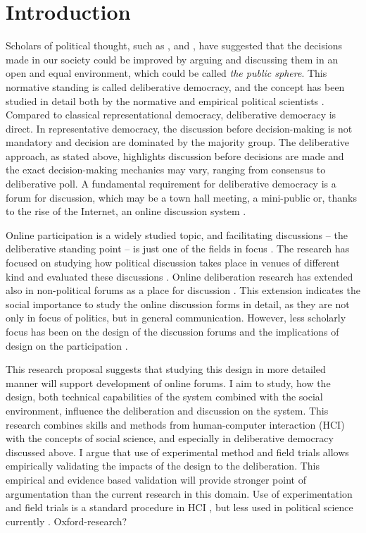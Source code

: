 \documentclass{article}
\begin{document}
\newpage

\section{Introduction}

Scholars of political thought, such as ,  and , have suggested that the decisions made in our society could be improved by arguing and discussing them in an open and equal environment, which could be called \textit{the public sphere}. This normative standing is called deliberative democracy, and the concept has been studied in detail both by the normative and empirical political scientists . Compared to classical representational democracy, deliberative democracy is direct. In representative democracy, the discussion before decision-making is not mandatory and decision are dominated by the majority group. The deliberative approach, as stated above, highlights discussion before decisions are made and the exact decision-making mechanics may vary, ranging from consensus to deliberative poll. A fundamental requirement for deliberative democracy is a forum for discussion, which may be a town hall meeting, a mini-public or, thanks to the rise of the Internet, an online discussion system .

Online participation is a widely studied topic, and facilitating discussions -- the deliberative standing point -- is just one of the fields in focus . The research has focused on studying how political discussion takes place in venues of different kind  and evaluated these discussions . Online deliberation research has extended also in non-political forums as a place for discussion \cite{graham12}. This extension indicates the social importance to study the online discussion forms in detail, as they are not only in focus of politics, but in general communication. However, less scholarly focus has been on the design of the discussion forums and the implications of design on the participation .

This research proposal suggests that studying this design in more detailed manner will support development of online forums. I aim to study, how the design, both technical capabilities of the system combined with the social environment, influence the deliberation and discussion on the system. This research combines skills and methods from human-computer interaction (HCI) with the concepts of social science, and especially in deliberative democracy discussed above. I argue that use of experimental method and field trials allows empirically validating the impacts of the design to the deliberation. This empirical and evidence based validation will provide stronger point of argumentation than the current research in this domain. Use of experimentation and field trials is a standard procedure in HCI , but less used in political science currently . Oxford-research?
\end{document}
